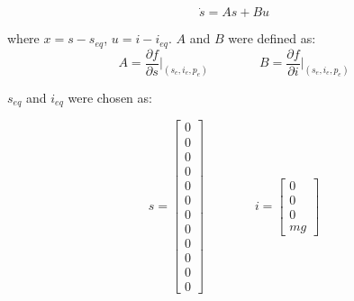 \begin{equation}
    \dot{s} = As+Bu
\end{equation}

where $x=s-s_{eq}$, $u=i-i_{eq}$. $A$ and $B$ were defined as:
\begin{equation}
    A = \frac{\partial f}{\partial s}\biggr\rvert_{(s_{e},i_{e},p_{e})} 
    \qquad\qquad
    B = \frac{\partial f}{\partial i}\biggr\rvert_{(s_{e},i_{e},p_{e})} 
\end{equation}

$s_{eq}$ and $i_{eq}$ were chosen as:

\begin{equation}
    s = \begin{bmatrix} 0 \\ 0 \\ 0 \\ 0 \\ 0 \\ 0 \\ 0 \\ 0 \\ 0 \\ 0 \\ 0 \\ 0 \end{bmatrix}  
  \qquad\qquad
  i = \begin{bmatrix} 0 \\ 0 \\ 0 \\ mg \end{bmatrix}
\end{equation}


